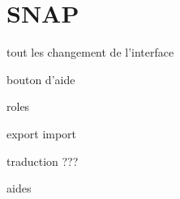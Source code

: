 \section{SNAP}
tout les changement de l'interface

bouton d'aide

roles

export import

traduction ???

aides
